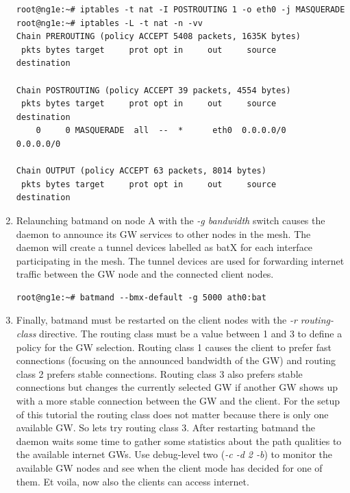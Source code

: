 \documentclass[11pt]{article}
\begin{document}
\begin{enumerate}
\begin{small} \begin{verbatim}
root@ng1e:~# iptables -t nat -I POSTROUTING 1 -o eth0 -j MASQUERADE
root@ng1e:~# iptables -L -t nat -n -vv
Chain PREROUTING (policy ACCEPT 5408 packets, 1635K bytes)
 pkts bytes target     prot opt in     out     source               destination

Chain POSTROUTING (policy ACCEPT 39 packets, 4554 bytes)
 pkts bytes target     prot opt in     out     source               destination
    0     0 MASQUERADE  all  --  *      eth0  0.0.0.0/0            0.0.0.0/0

Chain OUTPUT (policy ACCEPT 63 packets, 8014 bytes)
 pkts bytes target     prot opt in     out     source               destination
\end{verbatim} \end{small}

\item Relaunching batmand on node A with the \emph{-g bandwidth } switch causes the daemon to announce its GW services to other nodes in the mesh. The daemon will create a tunnel devices labelled as batX for each interface participating in the mesh. The tunnel devices are used for forwarding internet traffic between the GW node and the connected client nodes.

\begin{small} \begin{verbatim}
root@ng1e:~# batmand --bmx-default -g 5000 ath0:bat
\end{verbatim} \end{small}


\item Finally, batmand must be restarted on the client nodes with the \emph{-r routing-class} directive. 
The routing class must be a value between 1 and 3 to define a policy for the GW selection. 
Routing class 1 causes the client to prefer fast connections (focusing on the announced bandwidth of the GW) and routing class 2 prefers stable connections. 
Routing class 3 also prefers stable connections but changes the currently selected GW if another GW shows up with a more stable connection between the GW and the client.
For the setup of this tutorial the routing class does not matter because there is only one available GW. So lets try routing class 3.
After restarting batmand the daemon waits some time to gather some statistics about the path qualities to the available internet GWs. Use debug-level two (\emph{-c -d 2 -b}) to monitor the available GW nodes and see when the client mode has decided for one of them. 
Et voila, now also the clients can access internet.


\end{enumerate}
\end{document}
